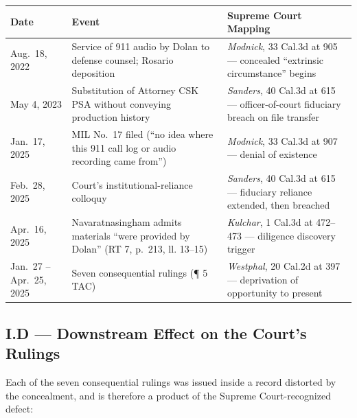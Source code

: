 {\def\LTcaptype{table} %
\begin{longtable}[]{@{}
  >{\raggedright\arraybackslash}p{}
  >{\raggedright\arraybackslash}p{}
  >{\raggedright\arraybackslash}p{}@{}}
\toprule\noalign{}
\begin{minipage}[b]{\linewidth}\raggedright
Date
\end{minipage} & \begin{minipage}[b]{\linewidth}\raggedright
Event
\end{minipage} & \begin{minipage}[b]{\linewidth}\raggedright
Supreme Court Mapping
\end{minipage} \\
\midrule\noalign{}
\endhead
\bottomrule\noalign{}
\endlastfoot
Aug.~18, 2022 & Service of 911 audio by Dolan to defense counsel; Rosario deposition & \emph{Modnick}, 33 Cal.3d at 905 --- concealed ``extrinsic circumstance'' begins \\
May 4, 2023 & Substitution of Attorney CSK {\textrightarrow{}} PSA without conveying production history & \emph{Sanders}, 40 Cal.3d at 615 --- officer-of-court fiduciary breach on file transfer \\
Jan.~17, 2025 & MIL No.~17 filed (``no idea where this 911 call log or audio recording came from'') & \emph{Modnick}, 33 Cal.3d at 907 --- denial of existence \\
Feb.~28, 2025 & Court's institutional-reliance colloquy & \emph{Sanders}, 40 Cal.3d at 615 --- fiduciary reliance extended, then breached \\
Apr.~16, 2025 & Navaratnasingham admits materials ``were provided by Dolan'' (RT 7, p.~213, ll. 13--15) & \emph{Kulchar}, 1 Cal.3d at 472--473 --- diligence discovery trigger \\
Jan.~27 -- Apr.~25, 2025 & Seven consequential rulings (¶ 5 TAC) & \emph{Westphal}, 20 Cal.2d at 397 --- deprivation of opportunity to present \\
\end{longtable}
}

\subsection{I.D --- Downstream Effect on the Court's Rulings}\label{i.d-downstream-effect-on-the-courts-rulings}

Each of the seven consequential rulings was issued inside a record distorted by the concealment, and is therefore a product of the Supreme Court-recognized defect:

